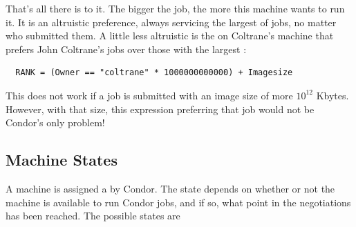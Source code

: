 That's all there is to it.
The bigger the job, the more this machine wants to run it.
It is an altruistic preference, always servicing
the largest of jobs, no matter who submitted them.
A little less altruistic is the  on Coltrane's machine that
prefers John Coltrane's jobs over those with the largest
:
\begin{verbatim}
  RANK = (Owner == "coltrane" * 1000000000000) + Imagesize
\end{verbatim}
This  does not work if a job is submitted with an image
size of more $10^{12}$ Kbytes.
However, with that size, this  expression
preferring that job would not be Condor's
only problem! 

\subsection{\label{sec:States} Machine States}

A machine is assigned a  by Condor.
The state depends on whether or not the machine is available to run Condor
jobs, and if so, what point in the negotiations has been reached.
The possible states are

